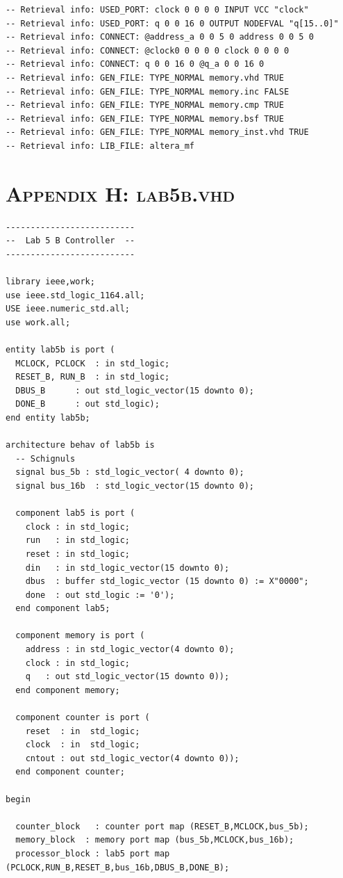 \documentclass[11pt]{report}
\begin{document}
\begin{spacing}{1.5}
\begin{lstlisting}
-- Retrieval info: USED_PORT: clock 0 0 0 0 INPUT VCC "clock"
-- Retrieval info: USED_PORT: q 0 0 16 0 OUTPUT NODEFVAL "q[15..0]"
-- Retrieval info: CONNECT: @address_a 0 0 5 0 address 0 0 5 0
-- Retrieval info: CONNECT: @clock0 0 0 0 0 clock 0 0 0 0
-- Retrieval info: CONNECT: q 0 0 16 0 @q_a 0 0 16 0
-- Retrieval info: GEN_FILE: TYPE_NORMAL memory.vhd TRUE
-- Retrieval info: GEN_FILE: TYPE_NORMAL memory.inc FALSE
-- Retrieval info: GEN_FILE: TYPE_NORMAL memory.cmp TRUE
-- Retrieval info: GEN_FILE: TYPE_NORMAL memory.bsf TRUE
-- Retrieval info: GEN_FILE: TYPE_NORMAL memory_inst.vhd TRUE
-- Retrieval info: LIB_FILE: altera_mf
\end{lstlisting}

\chapter*{\scshape Appendix H: lab5b.vhd}
\label{app:a}
\vspace{15px}
\begin{lstlisting}
--------------------------
--  Lab 5 B Controller  --
--------------------------

library ieee,work;
use ieee.std_logic_1164.all;
USE ieee.numeric_std.all;
use work.all;

entity lab5b is port (
  MCLOCK, PCLOCK  : in std_logic;
  RESET_B, RUN_B  : in std_logic;
  DBUS_B      : out std_logic_vector(15 downto 0);
  DONE_B      : out std_logic);
end entity lab5b;

architecture behav of lab5b is
  -- Schignuls
  signal bus_5b : std_logic_vector( 4 downto 0);
  signal bus_16b  : std_logic_vector(15 downto 0);

  component lab5 is port (
    clock : in std_logic;
    run   : in std_logic;
    reset : in std_logic;
    din   : in std_logic_vector(15 downto 0);
    dbus  : buffer std_logic_vector (15 downto 0) := X"0000"; 
    done  : out std_logic := '0');
  end component lab5;

  component memory is port (
    address : in std_logic_vector(4 downto 0);
    clock : in std_logic;
    q   : out std_logic_vector(15 downto 0));
  end component memory;

  component counter is port (
    reset  : in  std_logic;
    clock  : in  std_logic;
    cntout : out std_logic_vector(4 downto 0));
  end component counter;

begin
  
  counter_block   : counter port map (RESET_B,MCLOCK,bus_5b);
  memory_block  : memory port map (bus_5b,MCLOCK,bus_16b);
  processor_block : lab5 port map (PCLOCK,RUN_B,RESET_B,bus_16b,DBUS_B,DONE_B);


\end{lstlisting}
\end{spacing}
\end{document}
